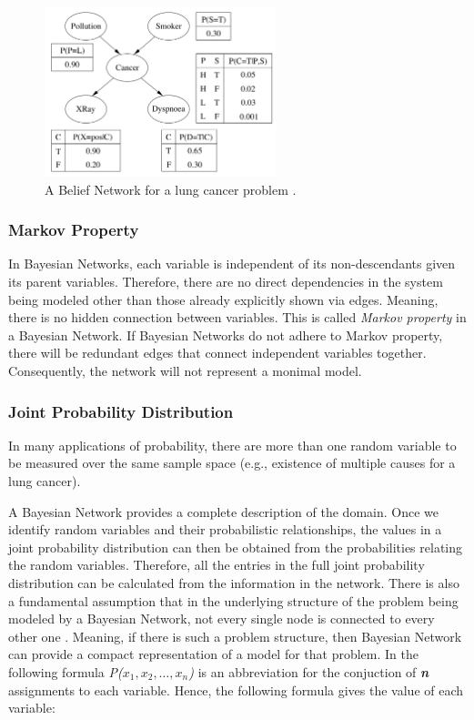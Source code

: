 \documentclass[11pt]{article}
\begin{document}
\begin{figure}[tbh]
  \center
  \includegraphics[width=0.6\textwidth]{figure/bbn.png}
  \caption{A Belief Network for a lung cancer problem
  \cite{korb:bayesian-ai}.}
  \label{fig:bbn}
\end{figure}

\subsubsection{Markov Property}

In Bayesian Networks, each variable is independent of its non-descendants given
its parent variables. Therefore, there are no direct dependencies in the system
being modeled other than those already explicitly shown via edges. Meaning,
there is no hidden connection between variables. This is called \textit{Markov
property} in a Bayesian Network. If Bayesian Networks do not adhere to Markov
property, there will be redundant edges that connect independent variables
together. Consequently, the network will not represent a monimal model.

\subsubsection{Joint Probability Distribution}

In many applications of probability, there are more than one random variable to
be measured over the same sample space (e.g., existence of multiple causes
for a lung cancer).

A Bayesian Network provides a complete description of the domain. Once we
identify random variables and their probabilistic relationships, the values in a
joint probability distribution can then be obtained from the probabilities
relating the random variables. Therefore, all the entries in the full joint
probability distribution can be calculated from the information in the network.
There is also a fundamental assumption that in the underlying structure of the
problem being modeled by a Bayesian Network, not every single node is connected
to every other one \cite{korb:bayesian-ai}. Meaning, if there is such a problem
structure, then Bayesian Network can provide a compact representation of a
model for that problem. In the following formula \textit{P($x_1, x_2, \ldots,
x_n$)} is an abbreviation for the conjuction of \textit{\textbf{n}} assignments
to each variable. Hence, the following formula gives the value of each variable:
\end{document}
